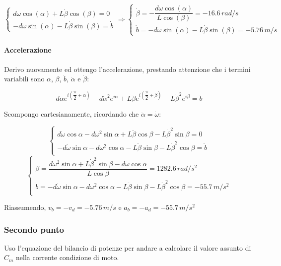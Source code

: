 \documentclass[main.tex]{subfiles}
\begin{document}
\[
\begin{cases}
	d\omega\cos(\alpha) + L\dot{\beta}\cos(\beta) = 0\\
	-d\omega\sin(\alpha) - L\dot{\beta}\sin(\beta) = \dot{b}
\end{cases}
\Longrightarrow
\begin{cases}
	\dot{\beta} = -\dfrac{d\omega\cos(\alpha)}{L\cos(\beta)} = -16.6\,rad/s\\
	\dot{b} =-d\omega\sin(\alpha) - L\dot{\beta}\sin(\beta) = -5.76\,m/s
\end{cases}
\]

\paragraph{Accelerazione} Derivo nuovamente ed ottengo l'accelerazione, prestando attenzione che i termini variabili sono $\alpha$, $\beta$, $\dot{b}$, $\dot{\alpha}$ e $\dot{\beta}$:

\[
	d\ddot{\alpha}e^{i \left (\dfrac{\pi}{2} + \alpha\right )} - d\dot{\alpha}^2e^{i\alpha} + L\ddot{\beta}e^{i \left (\dfrac{\pi}{2} + \beta\right )} - L\dot{\beta}^2e^{i\beta}= \ddot{b}
\]

Scompongo cartesianamente, ricordando che $\ddot{\alpha} = \dot{\omega}$:

\[
	\begin{cases}
	d\dot{\omega}\cos\alpha - d\omega^2\sin\alpha + L\ddot{\beta}\cos\beta - L\dot{\beta}^2\sin\beta = 0\\
	-d\dot{\omega}\sin\alpha - d\omega^2\cos\alpha - L\ddot{\beta}\sin\beta - L\dot{\beta}^2\cos\beta = \ddot{b}\\
	\end{cases}
\]
\[
	\begin{cases}
	\ddot{\beta} = \dfrac{d\omega^2\sin\alpha + L\dot{\beta}^2\sin\beta -d\dot{\omega}\cos\alpha}{L\cos\beta} = 1282.6\,rad/s^2 \\
	\ddot{b} = -d\dot{\omega}\sin\alpha - d\omega^2\cos\alpha - L\ddot{\beta}\sin\beta - L\dot{\beta}^2\cos\beta = -55.7\,m/s^2\\
	\end{cases}
\]

Riassumendo, $v_b = -v_d = -5.76\,m/s$ e $a_b = -a_d = -55.7\,m/s^2$

\subsubsection{Secondo punto}

Uso l'equazione del bilancio di potenze per andare a calcolare il valore assunto di $C_m$ nella corrente condizione di moto.
\end{document}
